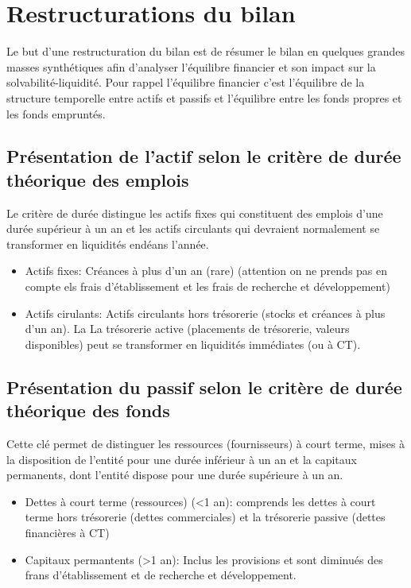 \documentclass{article}
\begin{document}
\section{Restructurations du bilan}
Le but d'une restructuration du bilan est de résumer le bilan en quelques grandes masses synthétiques afin d'analyser l'équilibre financier et son impact sur la solvabilité-liquidité. Pour rappel l'équilibre financier c'est l'équilibre de la structure temporelle entre actifs et passifs et l'équilibre entre les fonds propres et les fonds empruntés. 

\subsection{Présentation de l'actif selon le critère de durée théorique des emplois}
Le critère de durée distingue les actifs fixes qui constituent des emplois d'une durée supérieur à un an et les actifs circulants qui devraient normalement se transformer en liquidités endéans l'année.
\begin{itemize}
    \item Actifs fixes: Créances à plus d'un an (rare) (attention on ne prends pas en compte els frais d'établissement et les frais de recherche et développement)
    \item Actifs cirulants: Actifs circulants hors trésorerie (stocks et créances à plus d'un an). La La trésorerie active (placements de trésorerie, valeurs disponibles) peut se transformer en liquidités immédiates (ou à CT).  
\end{itemize}

\subsection{Présentation du passif selon le critère de durée théorique des fonds}
Cette clé permet de distinguer les ressources (fournisseurs) à court terme, mises à la disposition de l'entité pour une durée inférieur à un an et la capitaux permanents, dont l'entité dispose pour une durée supérieure à un an. 
\begin{itemize}
    \item Dettes à court terme (ressources) (<1 an): comprends les dettes à court terme hors trésorerie (dettes commerciales) et la trésorerie passive (dettes financières à CT)
    \item Capitaux permantents (>1 an): Inclus les provisions et sont diminués des frans d'établissement et de recherche et développement.
\end{itemize}
\end{document}
